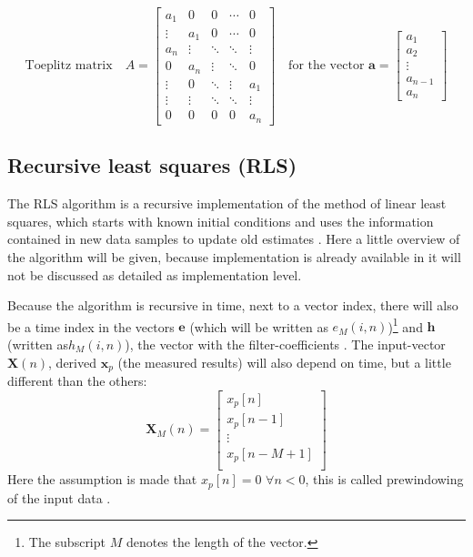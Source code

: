 \begin{equation}
\label{eqn:toeplitz}
\text{Toeplitz matrix}\quad
A=\left[
\begin{array}{ccccc}
a_1&0&0&\cdots&0\\
\vdots&a_1&0&\cdots&0\\
a_n&\vdots&\ddots&\ddots&\vdots\\
0&a_n&\vdots&\ddots&0\\
\vdots&0&\ddots&\vdots&a_1\\
\vdots&\vdots&\ddots&\ddots&\vdots\\
0&0&0&0&a_n
\end{array}
\right]\quad\text{for the vector }\mathbf{a}=\left[
\begin{array}{c}
a_1\\
a_2\\
\vdots\\
a_{n-1}\\
a_n
\end{array}\right]
\end{equation}

\subsection{Recursive least squares (RLS)}
\label{ssec:rls}
The RLS algorithm is a recursive implementation of the method of linear least squares, which starts with known initial conditions and uses the information contained  in new data samples to update old estimates \cite[p.~562-570]{book:adaptivefiltertheory}.
Here a little overview of the algorithm will be given, because implementation is already available in {\matlab} it will not be discussed as detailed as implementation level.

Because the algorithm is recursive in time, next to a vector index, there will also be a time index in the vectors $\mathbf{e}$ (which will be written as $e_M(i,n)$)\footnote{The subscript $M$ denotes the length of the vector.} and $\mathbf{h}$ (written as$h_M(i,n)$), the vector with the filter-coefficients \cite[p.~866-877]{book:dsp}.
The input-vector $\mathbf{X}(n)$, derived $\mathbf{x}_p$ (the measured results) will also depend on time, but a little different than the others:
\begin{equation*}
\mathbf{X}_M(n)=\left[
\begin{array}{c}
x_p[n]\\
x_p[n-1]\\
\vdots\\
x_p[n-M+1]\\
\end{array}
\right]
\end{equation*}
Here the assumption is made that $x_p[n]=0$ $\forall n<0$, this is called prewindowing of the input data \cite[p.~867]{book:dsp}.

